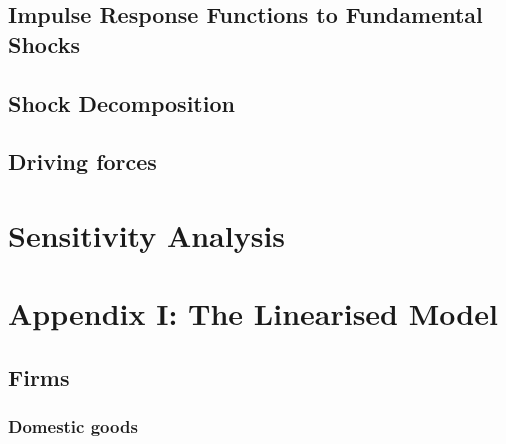 \documentclass[12pt,oneside,a4paper]{article}
\begin{document}
\subsection{Impulse Response Functions to Fundamental Shocks}
\subsection{Shock Decomposition}
\subsection{Driving forces}
\section{Sensitivity Analysis}
















\nocite{Palma:2014}
\nocite{Gali:2005}
\nocite{Lubik:2007}
\nocite{Carvalho:2015}
\nocite{Preston:2010}
\nocite{Monacelli:2005}
\nocite{Adolfson:2007}
\nocite{Adolfson:2008}
\nocite{Adolfson:2011}
\nocite{Altig:2011}
\nocite{Christiano:2011}
\nocite{Smets:2003}
\nocite{Smets:2007}
\nocite{Castro:2015}
\nocite{Christiano:2005}
\nocite{Woodford:2003}
\nocite{Gali:2015}
\nocite{Bernhardsen:2007}
\nocite{Brand:2018}
\nocite{Taylor:1993}



%
%



\section*{Appendix I: The Linearised Model}

\subsection*{Firms}

\subsubsection*{Domestic goods}
\end{document}
